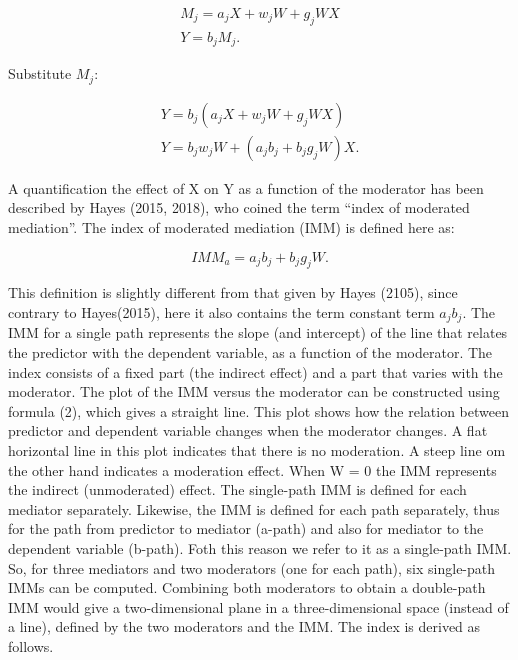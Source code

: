 \documentclass[man,floatsintext]{apa6}
\theoremstyle{definition}
\theoremstyle{definition}
\theoremstyle{definition}
\theoremstyle{remark}
\begin{document}
\begin{equation}
 \begin{split}
 M_j = a_j X + w_j W + g_j WX\\
 Y = b_j M_j.
 \end{split}
\end{equation}

Substitute \(M_j\):

\begin{equation}
   \begin{split}
   Y = b_j(a_j X + w_j W + g_j WX)\\
   Y = b_j w_j W + (a_j b_j + b_j g_j W)X.
   \end{split}
  \end{equation}

A quantification the effect of X on Y as a function of the moderator has
been described by Hayes (2015, 2018), who coined the term \enquote{index
of moderated mediation}. The index of moderated mediation (IMM) is
defined here as:

\begin{equation}
  IMM_a = a_j b_j + b_j g_j W.
  \end{equation}

This definition is slightly different from that given by Hayes (2105),
since contrary to Hayes(2015), here it also contains the term constant
term \(a_j b_j\). The IMM for a single path represents the slope (and
intercept) of the line that relates the predictor with the dependent
variable, as a function of the moderator. The index consists of a fixed
part (the indirect effect) and a part that varies with the moderator.
The plot of the IMM versus the moderator can be constructed using
formula (2), which gives a straight line. This plot shows how the
relation between predictor and dependent variable changes when the
moderator changes. A flat horizontal line in this plot indicates that
there is no moderation. A steep line om the other hand indicates a
moderation effect. When W = 0 the IMM represents the indirect
(unmoderated) effect. The single-path IMM is defined for each mediator
separately. Likewise, the IMM is defined for each path separately, thus
for the path from predictor to mediator (a-path) and also for mediator
to the dependent variable (b-path). Foth this reason we refer to it as a
single-path IMM. So, for three mediators and two moderators (one for
each path), six single-path IMMs can be computed. Combining both
moderators to obtain a double-path IMM would give a two-dimensional
plane in a three-dimensional space (instead of a line), defined by the
two moderators and the IMM. The index is derived as follows.
\end{document}
